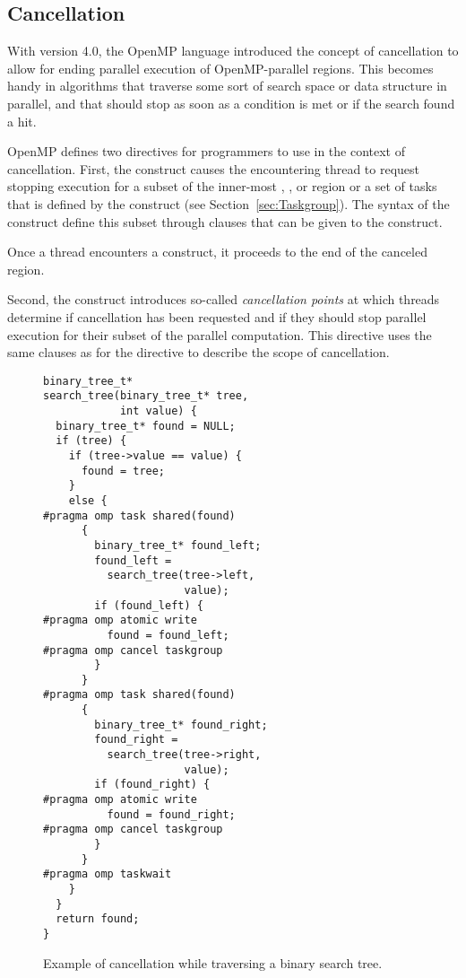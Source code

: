 \subsection{Cancellation}
\label{sec:Cancellation}

With version 4.0, the OpenMP language introduced the concept of cancellation to allow for ending parallel execution of OpenMP-parallel regions.
This becomes handy in algorithms that traverse some sort of search space or data structure in parallel, and that should stop as soon as a condition is met or if the search found a hit.

OpenMP defines two directives for programmers to use in the context of cancellation.
First, the  construct causes the encountering thread to request stopping execution for a subset of the inner-most , ,  or  region or a set of tasks that is defined by the  construct (see Section~\ref{sec:Taskgroup}).
The syntax of the  construct define this subset through clauses that can be given to the construct.

Once a thread encounters a  construct, it proceeds to the end of the canceled region.


Second, the  construct introduces so-called \emph{cancellation points} at which threads determine if cancellation has been requested and if they should stop parallel execution for their subset of the parallel computation.
This directive uses the same clauses as for the  directive to describe the scope of cancellation.


\begin{figure}
\begin{verbatim}
binary_tree_t*
search_tree(binary_tree_t* tree,
            int value) {
  binary_tree_t* found = NULL;
  if (tree) {
    if (tree->value == value) {
      found = tree;
    }
    else {
#pragma omp task shared(found)
      {
        binary_tree_t* found_left;
        found_left =
          search_tree(tree->left,
                      value);
        if (found_left) {
#pragma omp atomic write
          found = found_left;
#pragma omp cancel taskgroup
        }
      }
#pragma omp task shared(found)
      {
        binary_tree_t* found_right;
        found_right =
          search_tree(tree->right,
                      value);
        if (found_right) {
#pragma omp atomic write
          found = found_right;
#pragma omp cancel taskgroup
        }
      }
#pragma omp taskwait
    }
  }
  return found;
}
\end{verbatim}
\caption{Example of cancellation while traversing a binary search tree.\label{fig:Cancellation}}
\end{figure}

